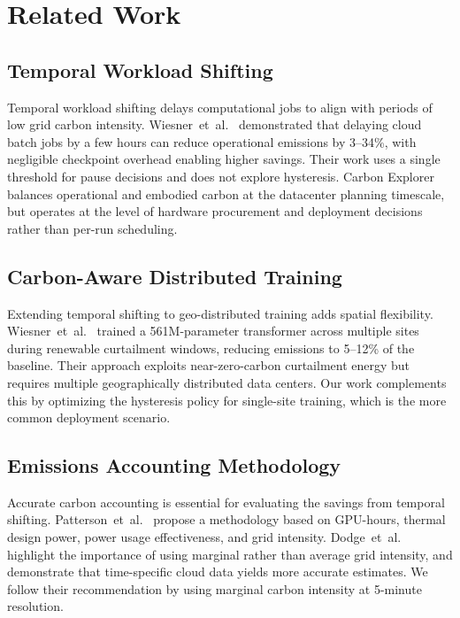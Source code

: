 
\chapter{Related Work}
\label{sec:related_work}

\section{Temporal Workload Shifting}

Temporal workload shifting delays computational jobs to align with periods of
low grid carbon intensity.  Wiesner~et~al.~\cite{wiesner_lets_2021}
demonstrated that delaying cloud batch jobs by a few hours can reduce
operational emissions by 3--34\%, with negligible checkpoint overhead enabling
higher savings.  Their work uses a single threshold for pause decisions and
does not explore hysteresis.  Carbon Explorer~\cite{acun_carbon_2023} balances
operational and embodied carbon at the datacenter planning timescale, but
operates at the level of hardware procurement and deployment decisions rather
than per-run scheduling.

\section{Carbon-Aware Distributed Training}

Extending temporal shifting to geo-distributed training adds spatial
flexibility.  Wiesner~et~al.~\cite{wiesner_distributed_2026} trained a
561M-parameter transformer across multiple sites during renewable curtailment
windows, reducing emissions to 5--12\% of the baseline.  Their approach
exploits near-zero-carbon curtailment energy but requires multiple
geographically distributed data centers.  Our work complements this by
optimizing the hysteresis policy for single-site training, which is the more
common deployment scenario.

\section{Emissions Accounting Methodology}

Accurate carbon accounting is essential for evaluating the savings from
temporal shifting.  Patterson~et~al.~\cite{patterson_carbon_nodate} propose a
methodology based on GPU-hours, thermal design power, power usage effectiveness, and grid intensity.
Dodge~et~al.~\cite{dodge_measuring_2022} highlight the importance of using
marginal rather than average grid intensity, and demonstrate that
time-specific cloud data yields more accurate estimates.  We follow their
recommendation by using marginal carbon intensity at 5-minute resolution.


